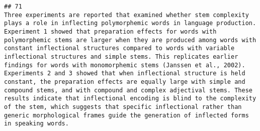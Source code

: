 \documentclass[
  english,
  man]{apa6}
\begin{document}
\begin{verbatim}
## 71                                                                                                                                                                                                                                                                                                                                                                                                                                                                                                                                                                                                                                                                                                                                                                                                                                                                                                                                                                                                                                                                                                                                                                                                                                                                                                                                                                                                                                                                                                                                                                                                                                                                                                                                     Three experiments are reported that examined whether stem complexity plays a role in inflecting polymorphemic words in language production. Experiment 1 showed that preparation effects for words with polymorphemic stems are larger when they are produced among words with constant inflectional structures compared to words with variable inflectional structures and simple stems. This replicates earlier findings for words with monomorphemic stems (Janssen et al., 2002). Experiments 2 and 3 showed that when inflectional structure is held constant, the preparation effects are equally large with simple and compound stems, and with compound and complex adjectival stems. These results indicate that inflectional encoding is blind to the complexity of the stem, which suggests that specific inflectional rather than generic morphological frames guide the generation of inflected forms in speaking words.

\end{verbatim}
\end{document}
